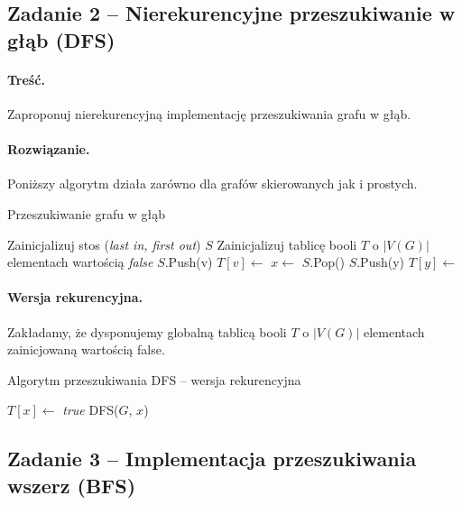 \subsection{Zadanie 2 -- Nierekurencyjne przeszukiwanie w głąb (DFS)}
\label{zad:dfsnr}
\paragraph{Treść.} Zaproponuj nierekurencyjną implementację
przeszukiwania grafu w głąb.

\paragraph{Rozwiązanie.}
Poniższy algorytm działa zarówno dla grafów skierowanych
jak i prostych.

\begin{algorithm}[H]
	\caption{Przeszukiwanie grafu w głąb}\label{Zadanie22a}
	\begin{algorithmic}[1]
		\State Zainicjalizuj stos (\textit{last in, first out}) $S$
		\State Zainicjalizuj tablicę booli $T$ o $|V(G)|$ elementach wartością 
		\textit{false}
		\State $S$.Push(v)
		\State $T[v] \gets$ \false
		\State $x \gets$ $S$.Pop()
		\State $S$.Push(y)
		\State $T[y] \gets$ \true 
		\EndIf
		\EndWhile
		\EndWhile
		\EndProcedure
	\end{algorithmic}
\end{algorithm}

\paragraph{Wersja rekurencyjna.} Zakładamy, że dysponujemy globalną
tablicą booli $T$ o $|V(G)|$ elementach zainicjowaną wartością 
\textsf{false}.

\begin{algorithm}[H]
	\caption{Algorytm przeszukiwania DFS -- wersja rekurencyjna}\label{Zadanie22b}
	\begin{algorithmic}[1]
		\State $T[x] \gets$ \textit{true}
		\State \textsc{DFS}($G$, $x$)
		\EndIf
		\EndWhile
		\EndProcedure
	\end{algorithmic}
\end{algorithm}

\subsection{Zadanie 3 -- Implementacja przeszukiwania wszerz (BFS)}
\label{zad:bfs}

